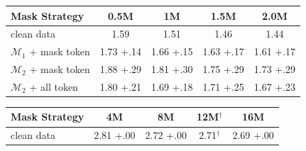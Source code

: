 \documentclass[11pt]{article}
\theoremstyle{plain}
\newcommand{\myvspace}[1]{\ifdefined\isarxiv\else\vspace{#1}\fi}
\begin{document}
\begin{figure}[t]
\centering
\begin{minipage}[t]{0.49\linewidth}
\centering
{}
\label{tab:noisy_training}
\myvspace{-1mm}
\ifdefined\isarxiv\vspace{1.8\baselineskip}\fi
{\scriptsize\setlength{\tabcolsep}{3pt}
\begin{tabular}{@{}lcccc@{}}
\toprule
Mask Strategy & 0.5M & 1M & 1.5M & 2.0M \\
\midrule
clean data                    & 1.59 & 1.51 & 1.46 & 1.44 \\
$\mathcal{M}_1$ + mask token  & 1.73 {\color{red}\tiny +.14} & 1.66 {\color{red}\tiny +.15} & 1.63 {\color{red}\tiny +.17} & 1.61 {\color{red}\tiny +.17} \\
$\mathcal{M}_2$ + mask token  & 1.88 {\color{red}\tiny +.29} & 1.81 {\color{red}\tiny +.30} & 1.75 {\color{red}\tiny +.29} & 1.73 {\color{red}\tiny +.29} \\
$\mathcal{M}_2$ + all token   & 1.80 {\color{red}\tiny +.21} & 1.69 {\color{red}\tiny +.18} & 1.71 {\color{red}\tiny +.25} & 1.67 {\color{red}\tiny +.23} \\
\bottomrule
\end{tabular}}
\end{minipage}\hfill
\begin{minipage}[t]{0.49\linewidth}
\centering
{}
\label{tab:noisy_extended}
\myvspace{-1mm}
{\tiny\setlength{\tabcolsep}{2pt}
\begin{tabular}{@{}lcccc@{}}
\toprule
Mask Strategy & 4M & 8M & 12M$^{\dagger}$ & 16M \\
\midrule
clean data          & 2.81 {\color{red}\tiny +.00} & 2.72 {\color{red}\tiny +.00} & 2.71$^{\dagger}$ & 2.69 {\color{red}\tiny +.00} \\

\end{tabular}}
\end{minipage}
\end{figure}
\end{document}
